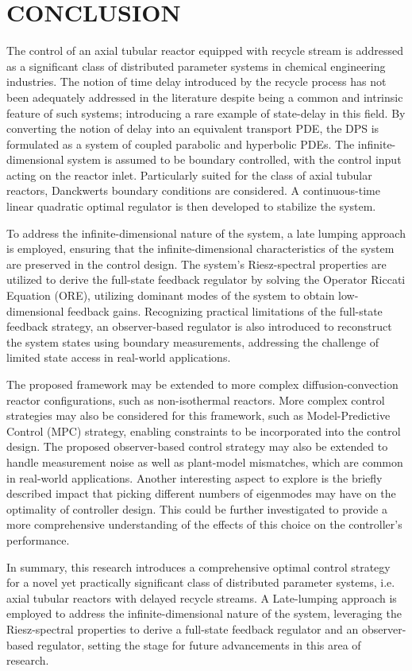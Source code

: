\section{CONCLUSION}

The control of an axial tubular reactor equipped with recycle stream is addressed as a significant class of distributed parameter systems in chemical engineering industries. The notion of time delay introduced by the recycle process has not been adequately addressed in the literature despite being a common and intrinsic feature of such systems; introducing a rare example of state-delay in this field. By converting the notion of delay into an equivalent transport PDE, the DPS is formulated as a system of coupled parabolic and hyperbolic PDEs. The infinite-dimensional system is assumed to be boundary controlled, with the control input acting on the reactor inlet. Particularly suited for the class of axial tubular reactors, Danckwerts boundary conditions are considered. A continuous-time linear quadratic optimal regulator is then developed to stabilize the system.

To address the infinite-dimensional nature of the system, a late lumping approach is employed, ensuring that the infinite-dimensional characteristics of the system are preserved in the control design. The system's Riesz-spectral properties are utilized to derive the full-state feedback regulator by solving the Operator Riccati Equation (ORE), utilizing dominant modes of the system to obtain low-dimensional feedback gains. Recognizing practical limitations of the full-state feedback strategy, an observer-based regulator is also introduced to reconstruct the system states using boundary measurements, addressing the challenge of limited state access in real-world applications.

The proposed framework may be extended to more complex diffusion-convection reactor configurations, such as non-isothermal reactors. More complex control strategies may also be considered for this framework, such as Model-Predictive Control (MPC) strategy, enabling constraints to be incorporated into the control design. The proposed observer-based control strategy may also be extended to handle measurement noise as well as plant-model mismatches, which are common in real-world applications. Another interesting aspect to explore is the briefly described impact that picking different numbers of eigenmodes may have on the optimality of controller design. This could be further investigated to provide a more comprehensive understanding of the effects of this choice on the controller's performance.

In summary, this research introduces a comprehensive optimal control strategy for a novel yet practically significant class of distributed parameter systems, i.e. axial tubular reactors with delayed recycle streams. A Late-lumping approach is employed to address the infinite-dimensional nature of the system, leveraging the Riesz-spectral properties to derive a full-state feedback regulator and an observer-based regulator, setting the stage for future advancements in this area of research.
